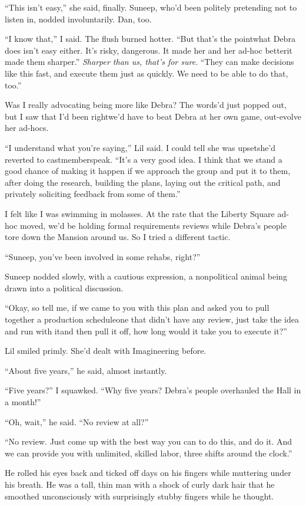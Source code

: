 “This isn't easy,” she said, finally. Suneep, who'd been politely
pretending not to listen in, nodded involuntarily. Dan, too.

“I know that,” I said. The flush burned hotter. “But that's the
point{\dash}what Debra does isn't easy either. It's risky, dangerous. It
made her and her ad-hoc better{\dash}it made them sharper.”
\emph{Sharper than us, that's for sure}. “They can make decisions
like this fast, and execute them just as quickly. We need to be
able to do that, too.”

Was I really advocating being more like Debra? The words'd just
popped out, but I saw that I'd been right{\dash}we'd have to beat Debra
at her own game, out-evolve her ad-hocs.

“I understand what you're saying,” Lil said. I could tell she was
upset{\dash}she'd reverted to castmemberspeak. “It's a very good idea. I
think that we stand a good chance of making it happen if we
approach the group and put it to them, after doing the research,
building the plans, laying out the critical path, and privately
soliciting feedback from some of them.”

I felt like I was swimming in molasses. At the rate that the
Liberty Square ad-hoc moved, we'd be holding formal requirements
reviews while Debra's people tore down the Mansion around us. So I
tried a different tactic.

“Suneep, you've been involved in some rehabs, right?”

Suneep nodded slowly, with a cautious expression, a nonpolitical
animal being drawn into a political discussion.

“Okay, so tell me, if we came to you with this plan and asked you
to pull together a production schedule{\dash}one that didn't have any
review, just take the idea and run with it{\dash}and then pull it off,
how long would it take you to execute it?”

Lil smiled primly. She'd dealt with Imagineering before.

“About five years,” he said, almost instantly.

“Five years?” I squawked. “Why five years? Debra's people
overhauled the Hall in a month!”

“Oh, wait,” he said. “No review at all?”

“No review. Just come up with the best way you can to do this, and
do it. And we can provide you with unlimited, skilled labor, three
shifts around the clock.”

He rolled his eyes back and ticked off days on his fingers while
muttering under his breath. He was a tall, thin man with a shock of
curly dark hair that he smoothed unconsciously with surprisingly
stubby fingers while he thought.

